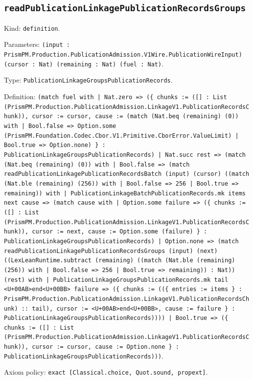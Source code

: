 \documentclass[11pt]{article}
\begin{document}
\subsection*{\texttt{readPublicationLinkagePublicationRecordsGroups}}
\noindent Kind: \texttt{definition}.\par
\noindent Parameters: \texttt{(input : PrismPM.Production.PublicationAdmission.V1Wire.PublicationWireInput) (cursor : Nat) (remaining : Nat) (fuel : Nat)}.\par
\noindent Type: \texttt{PublicationLinkageGroupsPublicationRecords}.\par
\noindent Definition: \texttt{(match fuel with | Nat.zero => (\{ chunks := ([] : List (PrismPM.Production.PublicationAdmission.LinkageV1.PublicationRecordsChunk)), cursor := cursor, cause := (match (Nat.beq (remaining) (0)) with | Bool.false => Option.some (PrismPM.Foundation.Codec.Cbor.V1.Primitive.CborError.ValueLimit) | Bool.true => Option.none) \} : PublicationLinkageGroupsPublicationRecords) | Nat.succ rest => (match (Nat.beq (remaining) (0)) with | Bool.false => (match readPublicationLinkagePublicationRecordsBatch (input) (cursor) ((match (Nat.ble (remaining) (256)) with | Bool.false => 256 | Bool.true => remaining)) with | PublicationLinkageBatchPublicationRecords.mk items next cause => (match cause with | Option.some failure => (\{ chunks := ([] : List (PrismPM.Production.PublicationAdmission.LinkageV1.PublicationRecordsChunk)), cursor := next, cause := Option.some (failure) \} : PublicationLinkageGroupsPublicationRecords) | Option.none => (match readPublicationLinkagePublicationRecordsGroups (input) (next) ((LexLeanRuntime.subtract (remaining) ((match (Nat.ble (remaining) (256)) with | Bool.false => 256 | Bool.true => remaining)) : Nat)) (rest) with | PublicationLinkageGroupsPublicationRecords.mk tail <U+00AB>end<U+00BB> failure => (\{ chunks := ((\{ entries := items \} : PrismPM.Production.PublicationAdmission.LinkageV1.PublicationRecordsChunk) :: tail), cursor := <U+00AB>end<U+00BB>, cause := failure \} : PublicationLinkageGroupsPublicationRecords)))) | Bool.true => (\{ chunks := ([] : List (PrismPM.Production.PublicationAdmission.LinkageV1.PublicationRecordsChunk)), cursor := cursor, cause := Option.none \} : PublicationLinkageGroupsPublicationRecords)))}.\par
\noindent Axiom policy: \texttt{exact [Classical.choice, Quot.sound, propext]}.\par
\end{document}

